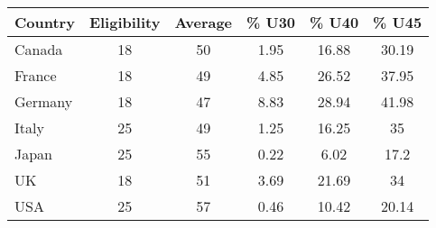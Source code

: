 \begin{tabular}{lccccc}
\toprule
Country & Eligibility & Average & \% U30 & \% U40 & \% U45 \\ 
\midrule
Canada & 18 & 50 & 1.95 & 16.88 & 30.19 \\ 
France & 18 & 49 & 4.85 & 26.52 & 37.95 \\ 
Germany & 18 & 47 & 8.83 & 28.94 & 41.98 \\ 
Italy & 25 & 49 & 1.25 & 16.25 & 35 \\ 
Japan & 25 & 55 & 0.22 & 6.02 & 17.2 \\ 
UK & 18 & 51 & 3.69 & 21.69 & 34 \\ 
USA & 25 & 57 & 0.46 & 10.42 & 20.14 \\ 
\bottomrule
\end{tabular}
